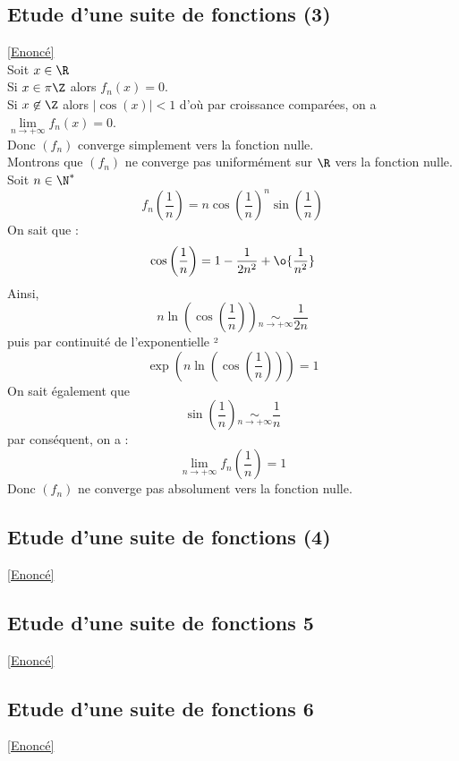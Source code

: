 \documentclass{book}
\begin{document}
	\subsection{Etude d'une suite de fonctions (3)}\label{sec:etude-dune-suite-de-fonctions-3}
		\textcolor{blue}{\hyperref[Etude d'une suite de fonctions 3]{[Enoncé]}}\\
	Soit $x\in\R$\\
	Si $x\in \pi\Z$ alors $f_n(x)=0$.\\
	Si $x\not\in\Z$ alors $|\cos(x)|<1$ d'où par croissance comparées, on a $\lim\limits_{n\to+\infty}f_n(x)=0$.\\
	Donc $(f_n)$ converge simplement vers la fonction nulle.\\
	Montrons que $(f_n)$ ne converge pas uniformément sur $\R$ vers la fonction nulle.\\
	Soit $n\in\N^*$ \[f_n\left(\frac{1}{n}\right)=n\cos\left(\frac{1}{n}\right)^n\sin\left(\frac{1}{n}\right)\]
	On sait que : \[\cos\left(\frac{1}{n}\right)=1-\frac{1}{2n^2}+\o{\frac{1}{n^2}}\]	
	Ainsi, \[n\ln\left(\cos\left(\frac{1}{n}\right)\right)\underset{n\to+\infty}{\sim}\frac{1}{2n}\]
	puis par continuité de l'exponentielle ²\[\exp\left(n\ln\left(\cos\left(\frac{1}{n}\right)\right)\right)=1\]
	On sait également que \[\sin\left(\frac{1}{n}\right)\underset{n\to+\infty}{\sim}\frac{1}{n}\] par conséquent, on a :  
	\[\lim_{n\to+\infty}f_n\left(\frac{1}{n}\right)=1\]
	Donc $(f_n)$ ne converge pas absolument vers la fonction nulle.
	\subsection{Etude d'une suite de fonctions (4)}\label{sec:etude-dune-suite-de-fonctions-4}
		\textcolor{blue}{\hyperref[Etude d'une suite de focntions 4]{[Enoncé]}}\\
	
	\subsection{Etude d'une suite de fonctions 5}\label{sec:etude-dune-suite-de-fonction-5}
		\textcolor{blue}{\hyperref[Etude d'une suite de fonctions 5]{[Enoncé]}}\\
	\subsection{Etude d'une suite de fonctions 6}\label{sec:etude-dune-suite-de-fonction-6}
		\textcolor{blue}{\hyperref[Etude d'une suite de fonctions 6]{[Enoncé]}}\\
\end{document}
